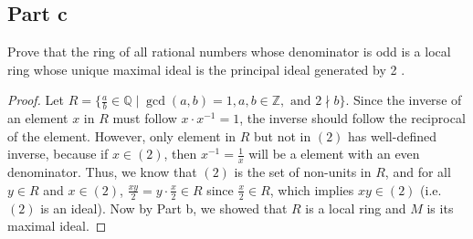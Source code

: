 \subsection{Part c}

\begin{question}
    Prove that the ring of all rational numbers whose denominator is odd is a local ring whose unique maximal ideal is the principal ideal generated by 2 .
\end{question}

\begin{answer}
    \begin{proof}
        Let $R = \{\tfrac{a}{b} \in \mathbb{Q} \mid \gcd(a,b) = 1, a,b \in \mathbb{Z}, \text{ and } 2 \nmid b\}$. Since the inverse of an element $x$ in $R$ must follow $x \cdot x^{-1} = 1$, the inverse should follow the reciprocal of the element. However, only element in $R$ but not in $(2)$ has well-defined inverse, because if $x \in (2)$, then $x^{-1} = \tfrac{1}{x}$ will be a element with an even denominator. Thus, we know that $(2)$ is the set of non-units in $R$, and for all $y \in R$ and $x \in (2)$, $\tfrac{xy}{2} = y \cdot \tfrac{x}{2} \in R$ since $\tfrac{x}{2} \in R$, which implies $xy \in (2)$ (i.e. $(2)$ is an ideal). Now by Part b, we showed that $R$ is a local ring and $M$ is its maximal ideal.
    \end{proof}
\end{answer}
